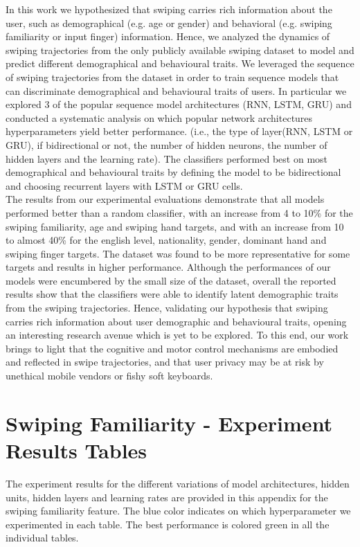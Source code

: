 \documentclass[11pt,oneside,a4paper,openright]{book}
\begin{document}
In this work we hypothesized that swiping carries rich information about the user,  such as demographical (e.g. age or gender) and behavioral (e.g. swiping familiarity or input finger) information. Hence,  we analyzed the dynamics of swiping trajectories from the only publicly available swiping dataset to model and predict different demographical and behavioural traits.  We leveraged  the sequence of swiping trajectories from the dataset in order to train sequence models that can discriminate demographical and behavioural traits of users. In particular we explored 3 of the popular sequence model architectures (RNN, LSTM, GRU) and conducted a systematic analysis on which popular network architectures hyperparameters yield better performance.  (i.e., the type of layer(RNN, LSTM or GRU), if bidirectional or not, the number of hidden neurons, the number of hidden layers and the learning rate).  The classifiers performed best on most demographical and behavioural traits by defining the model to be bidirectional and choosing recurrent layers with LSTM or GRU cells. \\

The results from our experimental evaluations demonstrate that  all models performed better than a random classifier, with an increase from 4 to 10\% for the swiping familiarity, age and swiping hand targets, and with an increase from 10 to almost 40\% for the english level, nationality, gender, dominant hand and swiping finger targets. The dataset was found to be more representative for some targets and results in higher performance. Although the  performances of our models were encumbered by the small size of the dataset, overall the reported results show that the classifiers were able to identify latent demographic traits from the swiping trajectories. Hence, validating our hypothesis that swiping carries rich information about user demographic and behavioural traits, opening an interesting research avenue which is yet to be explored. To this end, our work brings to light that the cognitive and motor control mechanisms are embodied and reflected in swipe trajectories,  and that user privacy may be at risk by unethical mobile vendors or fishy soft keyboards.






\newpage


\appendix
\chapter{Swiping Familiarity - Experiment Results Tables}\label{appendix:app_fam}
The experiment results for the different variations of model architectures, hidden units, hidden layers and learning rates are provided in this appendix for the swiping familiarity feature. The blue color indicates on which hyperparameter we experimented in each table. The best performance is colored green in all the individual tables.\\
\end{document}
